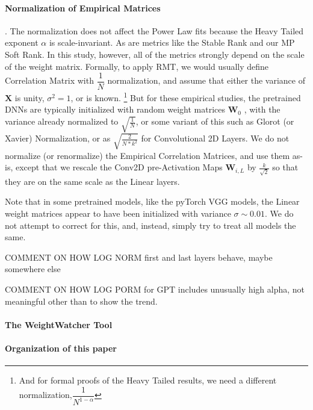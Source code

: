 \paragraph{Normalization of Empirical Matrices}.  
The normalization does not affect the Power Law fits because the Heavy Tailed exponent $\alpha$ is scale-invariant.
As are metrics like the Stable Rank and our MP Soft Rank. In this study, however, all of the metrics strongly depend 
on the scale of the weight matrix.
Formally, to apply RMT, we would usually define Correlation Matrix with $\dfrac{1}{N}$ normalization,
and assume that either the variance of $\mathbf{X}$ is unity, $\sigma^{2}=1$, or is known.
\footnote{And for formal proofs of the Heavy Tailed results, we need a different normalization,$\dfrac{1}{N^{1-\alpha}}$}
But for these empirical studies, the pretrained DNNs are typically initialized with random weight matrices $\mathbf{W}_{0}$ ,
with the variance already normalized to $\sqrt{\frac{1}{N}}$, or some variant of this such as Glorot (or Xavier) Normalization\cite{GloRot},
or as $\sqrt{\frac{2}{N*k^2}}$ for Convolutional 2D Layers. 
We do not normalize (or renormalize) the Empirical Correlation Matrices, and use them as-is,
except that we rescale the Conv2D pre-Activation Maps $\mathbf{W}_{i,L}$ by $\frac{k}{\sqrt{2}}$ so that they
are on the same scale as the Linear layers.


Note that in some pretrained models, like the pyTorch VGG models, the Linear weight matrices appear to have been 
initialized with variance $\sigma\sim0.01$.  We do not attempt to correct for this, and, instead, simply try to treat all
models the same.  

COMMENT ON HOW LOG NORM first and last layers behave, maybe somewhere else

COMMENT ON HOW LOG PORM  for GPT includes unusually high alpha, not meaningful other than to show the trend.

\paragraph{The WeightWatcher Tool}


\paragraph{Organization of this paper}

